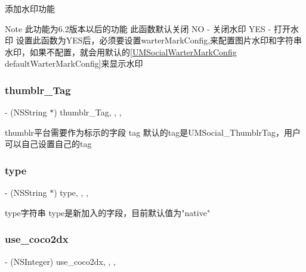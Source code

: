 添加水印功能 \begin{DoxyNote}{Note}
此功能为6.2版本以后的功能  此函数默认关闭 NO -\/ 关闭水印 Y\+ES -\/ 打开水印  设置此函数为\+Y\+E\+S后，必须要设置warter\+Mark\+Config,来配置图片水印和字符串水印，如果不配置，就会用默认的\mbox{[}\mbox{\hyperlink{interface_u_m_social_warter_mark_config}{U\+M\+Social\+Warter\+Mark\+Config}} default\+Warter\+Mark\+Config\mbox{]}来显示水印 
\end{DoxyNote}
\mbox{\label{interface_u_m_social_global_abfaa81238a9b30497d9d56e00537b072}} 
\subsubsection{\texorpdfstring{thumblr\+\_\+\+Tag}{thumblr\_Tag}}
{\footnotesize\ttfamily -\/ (N\+S\+String $\ast$) thumblr\+\_\+\+Tag\hspace{0.3cm}{\ttfamily [read]}, {\ttfamily [write]}, {\ttfamily [atomic]}, {\ttfamily [copy]}}

thumblr平台需要作为标示的字段 tag  默认的tag是\+U\+M\+Social\+\_\+\+Thumblr\+Tag，用户可以自己设置自己的tag \mbox{\label{interface_u_m_social_global_aa0c12aaf93858088d9f1420a4240fe46}} 
\subsubsection{\texorpdfstring{type}{type}}
{\footnotesize\ttfamily -\/ (N\+S\+String $\ast$) type\hspace{0.3cm}{\ttfamily [read]}, {\ttfamily [write]}, {\ttfamily [atomic]}, {\ttfamily [copy]}}

type字符串  type是新加入的字段，目前默认值为"native" \mbox{\label{interface_u_m_social_global_a27539eecc2695b0c55836966a1834451}} 
\subsubsection{\texorpdfstring{use\+\_\+coco2dx}{use\_coco2dx}}
{\footnotesize\ttfamily -\/ (N\+S\+Integer) use\+\_\+coco2dx\hspace{0.3cm}{\ttfamily [read]}, {\ttfamily [write]}, {\ttfamily [atomic]}, {\ttfamily [assign]}}

